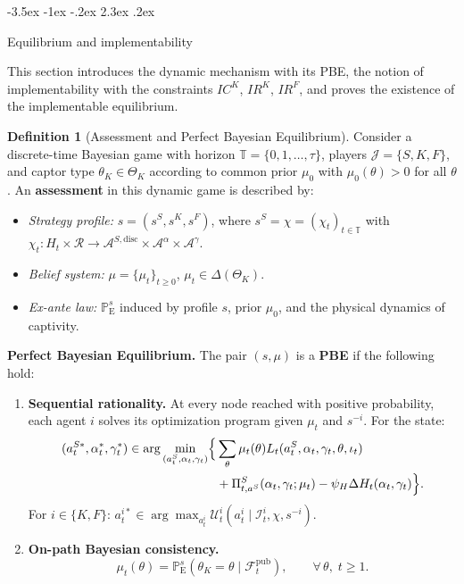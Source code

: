 \documentclass[12pt]{article}
\makeatletter
\numberwithin{equation}{section}
\numberwithin{table}{section}
\theoremstyle{definition}
\newtheorem{definition}[theorem]{Definition}
\newcommand{\ProbE}{\mathbb{P}_{\mathrm{E}}}
\renewcommand\section{\@startsection {section}{1}{\z@}%
                                   {-3.5ex \@plus -1ex \@minus -.2ex}%
                                   {2.3ex \@plus.2ex}%
                                   {\normalfont\Large\bfseries\raggedright}}
\makeatother
\begin{document}
\section{Equilibrium and implementability}
\label{sec:equilibrio}

\noindent This section introduces the dynamic mechanism with its PBE, the
notion of implementability with the constraints $IC^K$, $IR^K$, $IR^F$, and
proves the existence of the implementable equilibrium.


\begin{definition}[Assessment and Perfect Bayesian Equilibrium]
\label{def:pbe-mechanism}
Consider a discrete-time Bayesian game with horizon
$\mathbb{T}=\{0,1,\ldots,\tau\}$, players $\mathcal{J}=\{S,K,F\}$, and captor
type $\theta_K\in\Theta_K$ according to common prior $\mu_0$ with
$\mu_0(\theta)>0$ for all $\theta$. An \textbf{assessment} in this dynamic game is described by:
\begin{itemize}
  \item \emph{Strategy profile:} $s=(s^S,s^K,s^F)$, where
  $s^S=\chi=(\chi_t)_{t\in\mathbb{T}}$ with
  $\chi_t:H_t\times\mathcal{R}
   \to\mathcal{A}^{S,\mathrm{disc}}\times\mathcal{A}^\alpha\times\mathcal{A}^\gamma$.
  \item \emph{Belief system:} $\mu=\{\mu_t\}_{t\ge 0}$,
  $\mu_t\in\Delta(\Theta_K)$.
  \item \emph{Ex-ante law:} $\ProbE^s$ induced by profile $s$, prior
  $\mu_0$, and the physical dynamics of captivity.
\end{itemize}

\noindent\textbf{Perfect Bayesian Equilibrium.} The pair $(s,\mu)$ is a
\textbf{PBE} if the following hold:
\begin{enumerate}
  \item[\textup{(a)}] \textbf{Sequential rationality.}
  At every node reached with positive probability, each agent $i$ solves
  its optimization program given $\mu_t$ and $s^{-i}$. For the state:
  \[
  \begin{aligned}
  (a_t^{S\ast},\alpha_t^\ast,\gamma_t^\ast)\in
  \arg\min_{(a_t^S,\alpha_t,\gamma_t)}
  \Bigl\{&
  \sum_\theta\mu_t(\theta)L_t(a_t^S,\alpha_t,\gamma_t,\theta,\iota_t)\\
  &+\Pi_{t,a^S}^S(\alpha_t,\gamma_t;\mu_t)
  -\psi_H\Delta H_t(\alpha_t,\gamma_t)\Bigr\}.
  \end{aligned}
  \]
  For $i\in\{K,F\}$:
  $a_t^{i\ast}\in\arg\max_{a_t^i}\mathcal{U}_t^i(a_t^i\mid\mathcal{I}_t^i,\chi,s^{-i})$.
  \item[\textup{(b)}] \textbf{On-path Bayesian consistency.}
  \[
  \mu_t(\theta)=\ProbE^s(\theta_K=\theta\mid\mathcal{F}_t^{\mathrm{pub}}),
  \qquad\forall\,\theta,\;t\ge 1.
  \]
\end{enumerate}
\end{definition}
\end{document}

